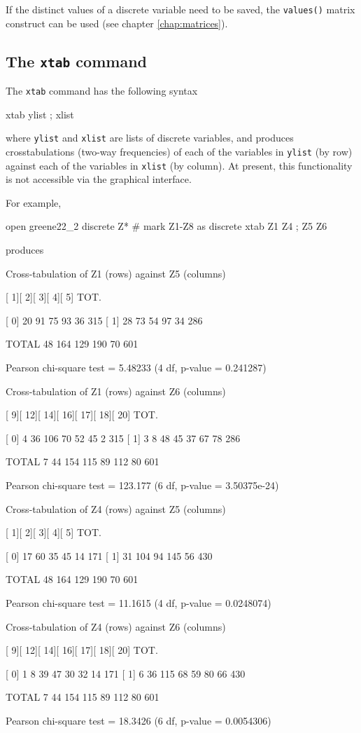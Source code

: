 If the distinct values of a discrete variable need to be saved, the
\texttt{values()} matrix construct can be used (see chapter
\ref{chap:matrices}).

\subsection{The \texttt{xtab} command}
\label{discr-xtab}

The \texttt{xtab} command has the following syntax
\begin{code}
  xtab ylist ; xlist
\end{code}
where \texttt{ylist} and \texttt{xlist} are lists of discrete
variables, and produces crosstabulations (two-way frequencies) of each
of the variables in \texttt{ylist} (by row) against each of the
variables in \texttt{xlist} (by column). At present, this
functionality is not accessible via the graphical interface.

For example, 
\begin{code}
  open greene22_2
  discrete Z* # mark Z1-Z8 as discrete
  xtab Z1 Z4 ; Z5 Z6
\end{code}
produces
\begin{code}
Cross-tabulation of Z1 (rows) against Z5 (columns)

       [   1][   2][   3][   4][   5]  TOT.
  
[   0]    20    91    75    93    36    315
[   1]    28    73    54    97    34    286

TOTAL     48   164   129   190    70    601

Pearson chi-square test = 5.48233 (4 df, p-value = 0.241287)

Cross-tabulation of Z1 (rows) against Z6 (columns)

       [   9][  12][  14][  16][  17][  18][  20]  TOT.
  
[   0]     4    36   106    70    52    45     2    315
[   1]     3     8    48    45    37    67    78    286

TOTAL      7    44   154   115    89   112    80    601

Pearson chi-square test = 123.177 (6 df, p-value = 3.50375e-24)

Cross-tabulation of Z4 (rows) against Z5 (columns)

       [   1][   2][   3][   4][   5]  TOT.
  
[   0]    17    60    35    45    14    171
[   1]    31   104    94   145    56    430

TOTAL     48   164   129   190    70    601

Pearson chi-square test = 11.1615 (4 df, p-value = 0.0248074)

Cross-tabulation of Z4 (rows) against Z6 (columns)

       [   9][  12][  14][  16][  17][  18][  20]  TOT.
  
[   0]     1     8    39    47    30    32    14    171
[   1]     6    36   115    68    59    80    66    430

TOTAL      7    44   154   115    89   112    80    601

Pearson chi-square test = 18.3426 (6 df, p-value = 0.0054306)
\end{code}

